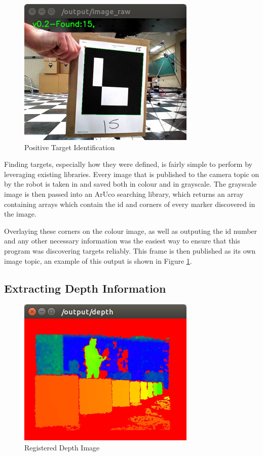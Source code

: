 \documentclass{article}[12]
\begin{document}
\begin{figure}[H]
	\centering
	\includegraphics[width=0.45\linewidth]{resultsTarget}
	\caption{Positive Target Identification}
	\label{fig:targ}
\end{figure}

Finding targets, especially how they were defined, is fairly simple to perform by leveraging existing libraries. Every image that is published to the camera topic on by the robot is taken in and saved both in colour and in grayscale. The grayscale image is then passed into an ArUco searching library, which returns an array containing arrays which contain the id and corners of every marker discovered in the image.

Overlaying these corners on the colour image, as well as outputing the id number and any other necessary information was the easiest way to ensure that this program was discovering targets reliably. This frame is then published as its own image topic, an example of this output is shown in Figure \ref{fig:targ}.

\subsection{Extracting Depth Information}

\begin{figure}[H]
	\centering
	\includegraphics[width=0.45\linewidth]{verificationDepth}
	\caption{Registered Depth Image}
	\label{fig:deeeeeeeeeeeeeeeeeeeeeeeeeeeeeeeeeeeeeeeeeeeeeeeeeeeeeep}
\end{figure}
\end{document}

